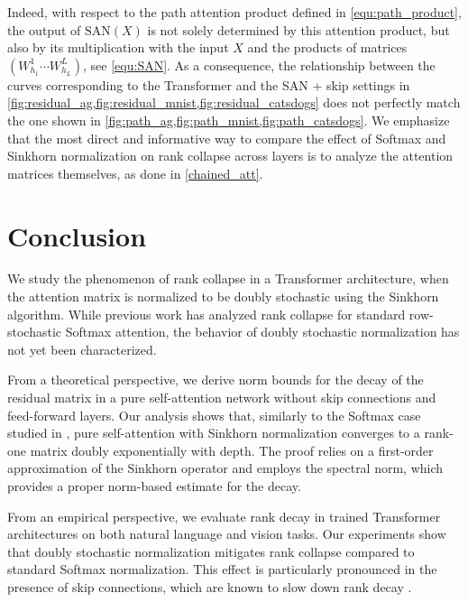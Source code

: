 \documentclass{article}
\theoremstyle{definition}
\theoremstyle{plain}
\begin{document}
Indeed, with respect to the {path} attention product defined in \ref{equ:path_product}, the output of $\mathrm{SAN}(X)$ is not solely determined by this attention product, but also by its multiplication with the input $X$ and the products of matrices $\left(W^{1}_{h_1} \cdots W^{L}_{h_L}\right)$, see \ref{equ:SAN}. As a consequence, the relationship between the curves corresponding to the Transformer and the SAN + skip settings in \cref{fig:residual_ag,fig:residual_mnist,fig:residual_catsdogs} does not perfectly match the one shown in \cref{fig:path_ag,fig:path_mnist,fig:path_catsdogs}. We emphasize that the most direct and informative way to compare the effect of Softmax and Sinkhorn normalization on rank collapse across layers is to analyze the attention matrices themselves, as done in \cref{chained_att}. 

\section{Conclusion}

We study the phenomenon of rank collapse in a Transformer architecture, when the attention matrix is normalized to be doubly stochastic using the Sinkhorn algorithm. While previous work has analyzed rank collapse for standard row-stochastic Softmax attention, the behavior of doubly stochastic normalization has not yet been characterized.

From a theoretical perspective, we derive norm bounds for the decay of the residual matrix in a pure self-attention network without skip connections and feed-forward layers. Our analysis shows that, similarly to the Softmax case studied in \cite{dong2021attention}, pure self-attention with Sinkhorn normalization converges to a rank-one matrix doubly exponentially with depth. The proof relies on a first-order approximation of the Sinkhorn operator and employs the spectral norm, which provides a proper norm-based estimate for the decay.

From an empirical perspective, we evaluate rank decay in trained Transformer architectures on both natural language and vision tasks. Our experiments show that doubly stochastic normalization mitigates rank collapse compared to standard Softmax normalization. This effect is particularly pronounced in the presence of skip connections, which are known to slow down rank decay \cite{dong2021attention}.
\end{document}
